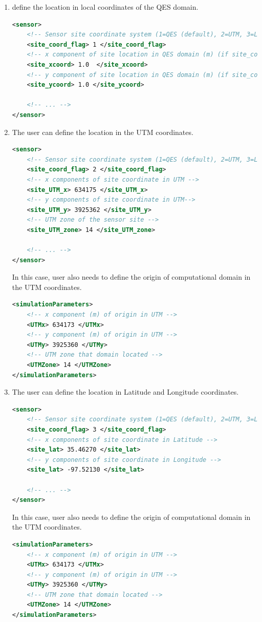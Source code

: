 \begin{enumerate}
\item define the location in local coordinates of the QES domain.

\begin{lstlisting}[language=XML]
<sensor>
	<!-- Sensor site coordinate system (1=QES (default), 2=UTM, 3=Lat/Lon) -->
	<site_coord_flag> 1 </site_coord_flag>
	<!-- x component of site location in QES domain (m) (if site_coord_flag = 1) -->
	<site_xcoord> 1.0  </site_xcoord>
	<!-- y component of site location in QES domain (m) (if site_coord_flag = 1)-->
	<site_ycoord> 1.0 </site_ycoord>
	
	<!-- ... -->
</sensor>
\end{lstlisting}
\noindent

\item The user can define the location in the UTM coordinates. 
\begin{lstlisting}[language=XML]
<sensor>
	<!-- Sensor site coordinate system (1=QES (default), 2=UTM, 3=Lat/Lon) -->
	<site_coord_flag> 2 </site_coord_flag>
	<!-- x components of site coordinate in UTM -->
	<site_UTM_x> 634175 </site_UTM_x>
	<!-- y components of site coordinate in UTM-->
	<site_UTM_y> 3925362 </site_UTM_y>
	<!-- UTM zone of the sensor site -->
	<site_UTM_zone> 14 </site_UTM_zone>
	
	<!-- ... -->
</sensor>
\end{lstlisting}

In this case, user also needs to define the origin of computational domain in the UTM coordinates.
\begin{lstlisting}[language=XML]
<simulationParameters>
	<!-- x component (m) of origin in UTM -->
	<UTMx> 634173 </UTMx>
	<!-- y component (m) of origin in UTM -->
	<UTMy> 3925360 </UTMy>
	<!-- UTM zone that domain located -->
	<UTMZone> 14 </UTMZone>
</simulationParameters>
\end{lstlisting}


\item The user can define the location in Latitude and Longitude coordinates. 
\begin{lstlisting}[language=XML]
<sensor>
	<!-- Sensor site coordinate system (1=QES (default), 2=UTM, 3=Lat/Lon) -->
	<site_coord_flag> 3 </site_coord_flag>
	<!-- x components of site coordinate in Latitude -->
	<site_lat> 35.46270 </site_lat>
	<!-- y components of site coordinate in Longitude -->
	<site_lat> -97.52130 </site_lat>
	
	<!-- ... -->
</sensor>
\end{lstlisting}

In this case, user also needs to define the origin of computational domain in the UTM coordinates.
\begin{lstlisting}[language=XML] 
<simulationParameters>
	<!-- x component (m) of origin in UTM -->
	<UTMx> 634173 </UTMx>
	<!-- y component (m) of origin in UTM -->
	<UTMy> 3925360 </UTMy>
	<!-- UTM zone that domain located -->
	<UTMZone> 14 </UTMZone>
</simulationParameters>
\end{lstlisting}

\end{enumerate}

